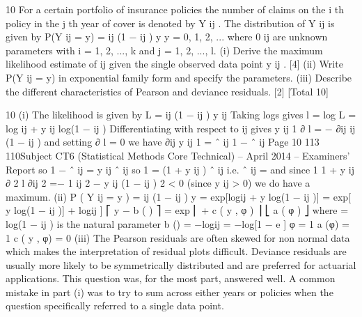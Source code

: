 10
For a certain portfolio of insurance policies the number of claims on the i th policy in
the j th year of cover is denoted by Y ij . The distribution of Y ij is given by
P(Y ij = y) = \theta  ij (1 − \theta  ij ) y
y = 0, 1, 2, ...
where 0 \leq  \theta  ij  are unknown parameters with i = 1, 2, ..., k and j = 1, 2, ..., l.
(i) Derive the maximum likelihood estimate of \theta  ij given the single observed data
point y ij .
[4]
(ii) Write P(Y ij = y) in exponential family form and specify the parameters.
(iii) Describe the different characteristics of Pearson and deviance residuals.
[2]
[Total 10]

\newpage

10
(i)
The likelihood is given by
L = \theta  ij (1 − \theta  ij )
y ij
Taking logs gives
l = log L = log \theta  ij + y ij log(1 − \theta  ij )
Differentiating with respect to \theta  ij gives
y ij
1
∂ l
=
−
∂\theta  ij \theta  ij (1 − \theta  ij )
and setting
∂ l
= 0 we have
∂\theta  ij
y ij
1
=
\theta  ˆ ij 1 − \theta  ˆ ij
Page 10
113
110Subject CT6 (Statistical Methods Core Technical) – April 2014 – Examiners’ Report
so 1 − \theta  ˆ ij = y ij \theta  ˆ ij
so 1 = (1 + y ij ) \theta  ˆ ij
i.e. \theta  ˆ ij =
and since
1
1 + y ij
∂ 2 l
∂\theta  ij 2
=−
1
\theta  ij 2
−
y ij
(1 − \theta  ij ) 2
< 0
(since y ij > 0)
we do have a maximum.
(ii)
P ( Y ij = y ) = \theta  ij (1 − \theta  ij ) y
= exp[log\theta  ij + y log(1 − \theta  ij )]
= exp[ y log(1 − \theta  ij )] + log\theta  ij ]
⎡ y \theta  − b ( \theta  )
⎤
= exp ⎢
+ c ( y , φ ) ⎥
⎣ a ( φ )
⎦
where \theta 
= log(1 − \theta  ij ) is the natural parameter
b (\theta ) = −log\theta  ij = −log[1 − e \theta  ]
φ = 1
a (φ) = 1
c ( y , φ) = 0
(iii)
The Pearson residuals are often skewed for non normal data which makes the
interpretation of residual plots difficult.
Deviance residuals are usually more likely to be symmetrically distributed and
are preferred for actuarial applications.
This question was, for the most part, answered well. A common mistake in part (i) was to try
to sum across either years or policies when the question specifically referred to a single data
point.
